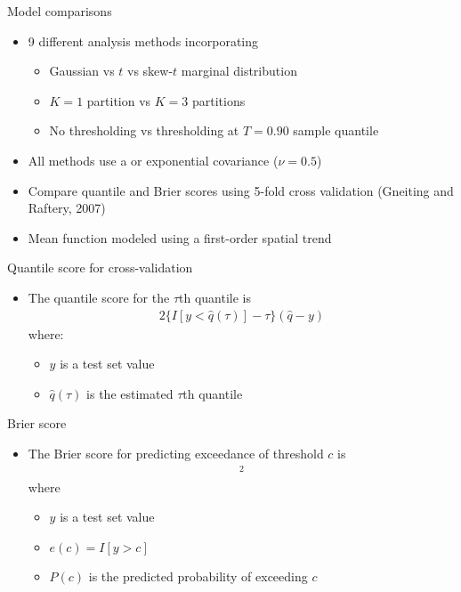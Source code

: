 \documentclass{beamer}
\begin{document}
\begin{frame}{Model comparisons}
  \begin{itemize} \setlength{\itemsep}{0.5em}
    \item 9 different analysis methods incorporating
    \begin{itemize}
      \item Gaussian vs $t$ vs skew-$t$ marginal distribution
      \item $K=1$ partition vs $K=3$ partitions
      \item No thresholding vs thresholding at $T=0.90$ sample quantile
    \end{itemize}
    \item All methods use a \Matern or exponential covariance ($\nu = 0.5$)
    \item Compare quantile and Brier scores using 5-fold cross validation (Gneiting and Raftery, 2007)
    \item Mean function modeled using a first-order spatial trend
  \end{itemize}
\end{frame}

\begin{frame}{Quantile score for cross-validation}
  \begin{itemize} \setlength{\itemsep}{0.5em}
    \item The quantile score for the $\tau$th quantile is
    \begin{align*}
      2 \{ I[y < \widehat{q}(\tau)] - \tau\} (\widehat{q} - y)
    \end{align*}
    where:
    \begin{itemize}
      \item $y$ is a test set value
      \item $\widehat{q}(\tau)$ is the estimated $\tau$th quantile
    \end{itemize}
  \end{itemize}
\end{frame}

\begin{frame}{Brier score}
  \begin{itemize} \setlength{\itemsep}{0.5em}
	\item The Brier score for predicting exceedance of threshold $c$ is
	\begin{align*}
	  [e(c) - P(c)]^2
	\end{align*}
	where
	\begin{itemize}
		\item $y$ is a test set value
		\item $e(c) = I[y > c]$
		\item $P(c)$ is the predicted probability of exceeding $c$
	\end{itemize}
  \end{itemize}
\end{frame}
\end{document}
